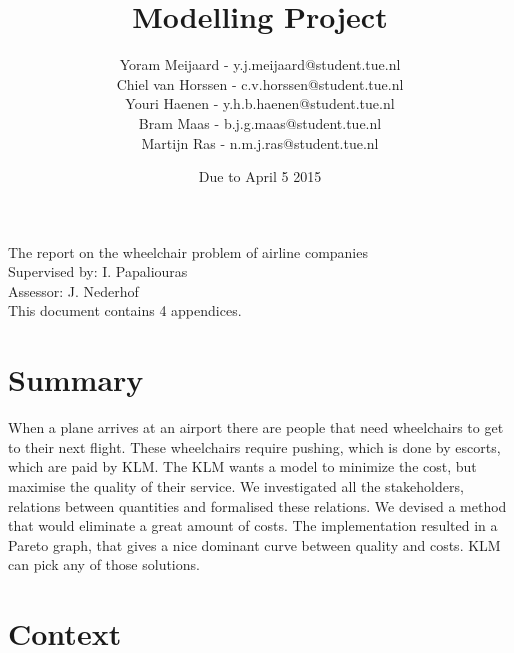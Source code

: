 \documentclass[a4paper, 11pt, notitlepage]{report}
\title{{\Huge Modelling Project} \vspace{290pt}} %
\author{Yoram Meijaard - y.j.meijaard@student.tue.nl\\Chiel van Horssen - c.v.horssen@student.tue.nl\\Youri Haenen - y.h.b.haenen@student.tue.nl\\Bram Maas - b.j.g.maas@student.tue.nl\\Martijn Ras - n.m.j.ras@student.tue.nl} %
\date{Due to April 5 2015} %
\begin{document}
\maketitle
\begin{center}
The report on the wheelchair problem of airline companies %
\\[12pt]
Supervised by: I. Papaliouras \\ Assessor: J. Nederhof %
\\[12pt]
This document contains 4 appendices.
\end{center}
\thispagestyle{empty}
\newpage


\tableofcontents





\pagebreak
\setcounter{chapter}{+4}
\chapter{Summary}
	When a plane arrives at an airport there are people that need wheelchairs to get to their next flight. These wheelchairs require pushing, which is done by escorts, which are paid by KLM. The KLM wants a model to minimize the cost, but maximise the quality of their service. We investigated all the stakeholders, relations between quantities and formalised these relations. We devised a method that would eliminate a great amount of costs. The implementation resulted in a Pareto graph, that gives a nice dominant curve between quality and costs. KLM can pick any of those solutions.


\chapter{Context}
\end{document}
